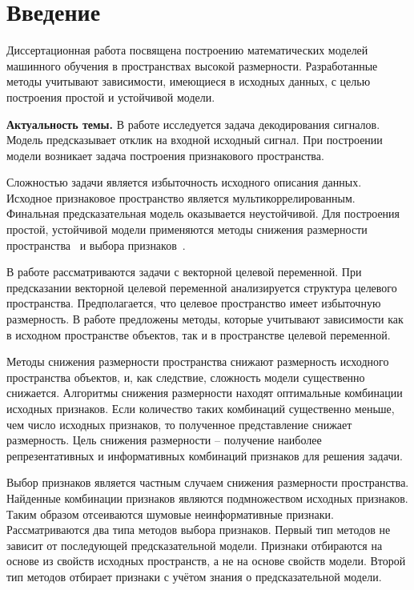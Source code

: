 \chapter*{Введение}

Диссертационная работа посвящена построению математических моделей машинного обучения в пространствах высокой размерности.
Разработанные методы учитывают зависимости, имеющиеся в исходных данных, с целью построения простой и устойчивой модели.

\textbf{Актуальность темы.} 
В работе исследуется задача декодирования сигналов. 
Модель предсказывает отклик на входной исходный сигнал.
При построении модели возникает задача построения признакового пространства. 

Сложностью задачи является избыточность исходного описания данных. 
Исходное признаковое пространство является мультикоррелированным.
Финальная предсказательная модель оказывается неустойчивой.
Для построения простой, устойчивой модели применяются методы снижения размерности пространства~\cite{chun2010sparse,mehmood2012review}  и выбора признаков~\cite{katrutsa2015stress,li2017feature}.

В работе рассматриваются задачи с векторной целевой переменной. 
При предсказании векторной целевой переменной анализируется структура целевого пространства.
Предполагается, что целевое пространство имеет избыточную размерность.
В работе предложены методы, которые учитывают зависимости как в исходном пространстве объектов, так и в пространстве целевой переменной.

Методы снижения размерности пространства снижают размерность исходного пространства объектов, и, как следствие, сложность модели существенно снижается. 
Алгоритмы снижения размерности находят оптимальные комбинации исходных признаков. 
Если количество таких комбинаций существенно меньше, чем число исходных признаков, то полученное представление снижает размерность.
Цель снижения размерности -- получение наиболее репрезентативных и информативных комбинаций признаков для решения задачи.

Выбор признаков является частным случаем снижения размерности пространства. 
Найденные комбинации признаков являются подмножеством исходных признаков.
Таким образом отсеиваются шумовые неинформативные признаки.
Рассматриваются два типа методов выбора признаков.
Первый тип методов не зависит от последующей предсказательной модели.
Признаки отбираются на основе из свойств исходных пространств, а не на основе свойств модели.
Второй тип методов отбирает признаки с учётом знания о предсказательной модели. 

